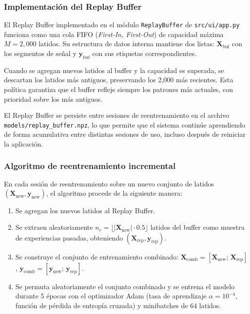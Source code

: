\subsubsection{Implementación del Replay Buffer}

El Replay Buffer implementado en el módulo \texttt{ReplayBuffer} de \texttt{src/ui/app.py} funciona como una cola FIFO (\textit{First-In, First-Out}) de capacidad máxima $M = 2{,}000$ latidos. Su estructura de datos interna mantiene dos listas: $\mathbf{X}_\text{buf}$ con los segmentos de señal y $\mathbf{y}_\text{buf}$ con sus etiquetas correspondientes.

Cuando se agregan nuevos latidos al buffer y la capacidad es superada, se descartan los latidos más antiguos, preservando los 2,000 más recientes. Esta política garantiza que el buffer refleje siempre los patrones más actuales, con prioridad sobre los más antiguos.

El Replay Buffer se persiste entre sesiones de reentrenamiento en el archivo \texttt{models/replay\_buffer.npz}, lo que permite que el sistema continúe aprendiendo de forma acumulativa entre distintas sesiones de uso, incluso después de reiniciar la aplicación.

\subsubsection{Algoritmo de reentrenamiento incremental}

En cada sesión de reentrenamiento sobre un nuevo conjunto de latidos $(\mathbf{X}_\text{new}, \mathbf{y}_\text{new})$, el algoritmo procede de la siguiente manera:

\begin{enumerate}
\item Se agregan los nuevos latidos al Replay Buffer.
\item Se extraen aleatoriamente $n_r = \lfloor |\mathbf{X}_\text{new}| \cdot 0.5 \rfloor$ latidos del buffer como muestra de experiencias pasadas, obteniendo $(\mathbf{X}_\text{rep}, \mathbf{y}_\text{rep})$.
\item Se construye el conjunto de entrenamiento combinado: $\mathbf{X}_\text{comb} = [\mathbf{X}_\text{new};\, \mathbf{X}_\text{rep}]$, $\mathbf{y}_\text{comb} = [\mathbf{y}_\text{new};\, \mathbf{y}_\text{rep}]$.
\item Se permuta aleatoriamente el conjunto combinado y se entrena el modelo durante 5 épocas con el optimizador Adam (tasa de aprendizaje $\alpha = 10^{-4}$, función de pérdida de entropía cruzada) y minibatches de 64 latidos.
\end{enumerate}

